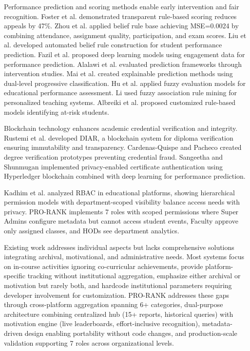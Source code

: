 \documentclass[12pt]{article}
\begin{document}
Performance prediction and scoring methods enable early intervention and fair recognition. Foster et al. \cite{foster2026} demonstrated transparent rule-based scoring reduces appeals by 47\%. Zhou et al. \cite{zhou2025} applied belief rule base achieving MSE=0.0024 by combining attendance, assignment quality, participation, and exam scores. Liu et al. \cite{liu2024} developed automated belief rule construction for student performance prediction. Fazil et al. \cite{fazil2024} proposed deep learning models using engagement data for performance prediction. Alalawi et al. \cite{alalawi2025} evaluated prediction frameworks through intervention studies. Mai et al. \cite{mai2024} created explainable prediction methods using dual-level progressive classification. Hu et al. \cite{hu2025} applied fuzzy evaluation models for educational performance assessment. Li \cite{li2024fuzzy} used fuzzy association rule mining for personalized teaching systems. Albreiki et al. \cite{albreiki2021} proposed customized rule-based models identifying at-risk students.

Blockchain technology enhances academic credential verification and integrity. Rustemi et al. \cite{rustemi2024} developed DIAR, a blockchain system for diploma verification ensuring immutability and transparency. Cardenas-Quispe and Pacheco \cite{cardenas2025} created degree verification prototypes preventing credential fraud. Sangeetha and Shunmugan \cite{sangeetha2025} implemented privacy-enabled certificate authentication using Hyperledger blockchain combined with deep learning for performance prediction.

Kadhim et al. \cite{kadhim2023} analyzed RBAC in educational platforms, showing hierarchical permission models with department-scoped visibility balance access needs with privacy. PRO-RANK implements 7 roles with scoped permissions where Super Admins configure metadata but cannot access student events, Faculty approve only assigned classes, and HODs see department analytics.

Existing work addresses individual aspects but lacks comprehensive solutions integrating archival, motivational, and administrative needs. Most systems focus on in-course activities ignoring co-curricular achievements, provide platform-specific tracking without institutional aggregation, emphasize either archival or motivation but rarely both, and hardcode institutional parameters requiring developer involvement for customization. PRO-RANK addresses these gaps through cross-platform aggregation spanning 6+ categories, dual-purpose architecture combining centralized hub (15+ reports, historical queries) with motivation engine (live leaderboards, effort-inclusive recognition), metadata-driven design enabling portability without code changes, and production-scale validation supporting 7 roles across organizational levels.
\end{document}
